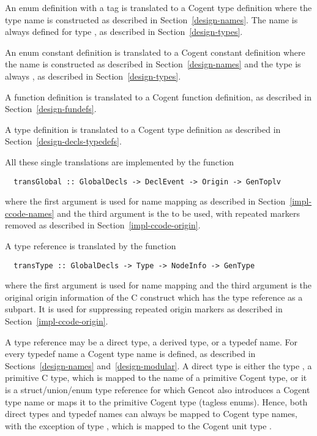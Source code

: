 An enum definition with a tag is translated to a Cogent type definition where the type name is constructed as described 
in Section~\ref{design-names}. The name is always defined for type , as described in Section~\ref{design-types}.

An enum constant definition is translated to a Cogent constant definition where the name is constructed as described 
in Section~\ref{design-names} and the type is always , as described in Section~\ref{design-types}.

A function definition is translated to a Cogent function definition, as described in Section~\ref{design-fundefs}.

A type definition is translated to a Cogent type definition as described in Section~\ref{design-decls-typedefs}.

All these single translations are implemented by the function
\begin{verbatim}
  transGlobal :: GlobalDecls -> DeclEvent -> Origin -> GenToplv
\end{verbatim}
where the first argument is used for name mapping as described in Section~\ref{impl-ccode-names} and the third
argument is the  to be used, with repeated markers removed as described in Section~\ref{impl-ccode-origin}.

A type reference is translated by the function
\begin{verbatim}
  transType :: GlobalDecls -> Type -> NodeInfo -> GenType 
\end{verbatim}
where the first argument is used for name mapping and the third argument is the original origin information of
the C construct which has the type reference as a subpart. It is used for suppressing repeated origin markers
as described in Section~\ref{impl-ccode-origin}.

A type reference may be a direct type, a derived type, or a typedef name. For every typedef name a Cogent type
name is defined, as described in Sections~\ref{design-names} and~\ref{design-modular}. A direct type is either
the type , a primitive C type, which is mapped to the name of a primitive Cogent type, or it is a 
struct/union/enum type reference for which Gencot also introduces a Cogent type name or maps it to the 
primitive Cogent type  (tagless enums). Hence, both direct types and typedef names can always be mapped
to Cogent type names, with the exception of type , which is mapped to the Cogent unit type \code{()}.

